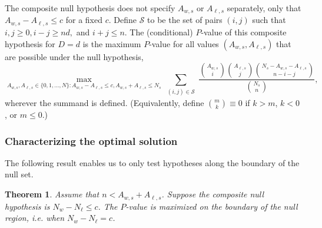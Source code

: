 \documentclass[runningheads]{llncs}
\newtheorem{thm}{Theorem}
\begin{document}
The composite null hypothesis does not specify $A_{w,s}$ or $A_{\ell,s}$ separately, only 
that $A_{w,s} - A_{\ell,s} \le c$ for a fixed $c$.
Define $\mathcal{S}$ to be the set of pairs $(i, j)$ such that $i, j\ge 0, i-j \ge nd,$ and $ i+j \leq n$.
The (conditional) $P$-value of this composite hypothesis for $D=d$ is the maximum $P$-value for all
values $(A_{w,s}, A_{\ell,s})$ that are possible under the null hypothesis,
\begin{equation}
  \max_{A_{w,s}, A_{\ell,s} \in \{0, 1, \ldots, N \}: A_{w,s} - A_{\ell,s} \le c, A_{w,s} + A_{\ell,s} \le N_s}
   \sum_{\substack{(i, j)\in \mathcal{S}}} \frac{ {A_{w,s } \choose i}{A_{\ell,s} \choose j}{N_s - A_{w,s} - A_{\ell,s} \choose n-i-j}}{{N_s \choose n}},
\end{equation}
wherever the summand is defined. 
(Equivalently, define ${m \choose k} \equiv 0$ if $k > m$, $k < 0$, or $m \le 0$.)

\subsubsection{Characterizing the optimal solution}
The following result enables us to only test hypotheses along the boundary of the null set.

\begin{thm}
Assume that $n < A_{w,s}+A_{\ell,s}$.
Suppose the composite null hypothesis is $N_w - N_\ell \leq c$.
The $P$-value is maximized on the boundary of the null region, i.e. when $N_w - N_\ell = c$.
\end{thm}
\end{document}
